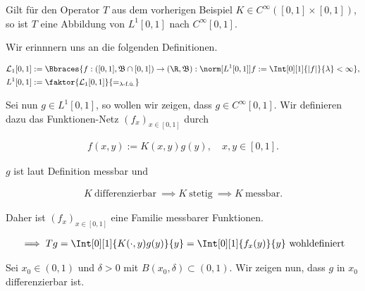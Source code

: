 
\begin{exercise}

Gilt für den Operator $T$ aus dem vorherigen Beispiel $K \in C^\infty([0, 1] \times [0, 1])$, so ist $T$ eine Abbildung von $L^1[0, 1]$ nach $C^\infty[0, 1]$.

\end{exercise}


\begin{solution}

Wir erinnnern uns an die folgenden Definitionen.

\begin{align*}
    \mathcal{L}_1[0, 1]
    & :=
    \Bbraces
    {
        f:
        ([0, 1], \mathfrak{B} \cap [0, 1]) \to (\R, \mathfrak{B}):
        \norm[{L^1[0, 1]}]{f} := \Int[0][1]{|f|}{\lambda} < \infty
    }, \\
    L^1[0, 1]
    & :=
    \faktor
    {
        \mathcal{L}_1[0, 1]
    }{
        =_{\lambda \text{-f.ü.}}
    }
\end{align*}

Sei nun $g \in L^1[0, 1]$, so wollen wir zeigen, dass $g \in C^\infty[0, 1]$.
Wir definieren dazu das Funktionen-Netz $(f_x)_{x \in [0, 1]}$ durch

\begin{align*}
    f(x, y) := K(x, y) g(y),
    \quad
    x, y \in [0, 1].
\end{align*}

$g$ ist laut Definition messbar und

\begin{align*}
    K ~\text{differenzierbar}~
    \implies
    K ~\text{stetig}~
    \implies
    K ~\text{messbar}.
\end{align*}

Daher ist $(f_x)_{x \in [0, 1]}$ eine Familie messbarer Funktionen.

\begin{align*}
    \implies
    Tg
    =
    \Int[0][1]{K(\cdot, y) g(y)}{y}
    =
    \Int[0][1]{f_x(y)}{y}
    ~\text{wohldefiniert}
\end{align*}

Sei $x_0 \in (0, 1)$ und $\delta > 0$ mit $B(x_0, \delta) \subset (0, 1)$.
Wir zeigen nun, dass $g$ in $x_0$ differenzierbar ist.


\end{solution}

